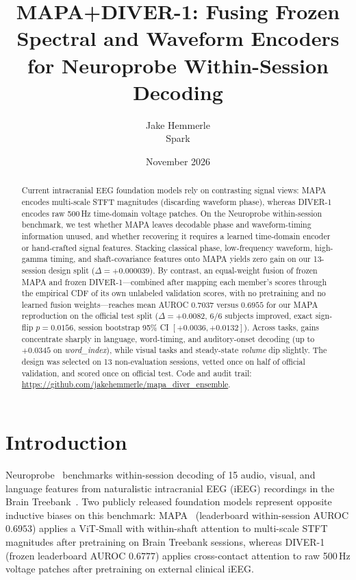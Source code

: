 \documentclass[11pt]{article}
\title{MAPA+DIVER-1: Fusing Frozen Spectral and Waveform Encoders\\for Neuroprobe Within-Session Decoding}
\author{Jake Hemmerle\\Spark}
\date{November 2026}
\newcommand{\coderepo}{\url{https://github.com/jakehemmerle/mapa_diver_ensemble}}
\begin{document}
\maketitle

\begin{abstract}
Current intracranial EEG foundation models rely on contrasting signal views: MAPA encodes multi-scale STFT magnitudes (discarding waveform phase), whereas DIVER-1 encodes raw 500\,Hz time-domain voltage patches. On the Neuroprobe within-session benchmark, we test whether MAPA leaves decodable phase and waveform-timing information unused, and whether recovering it requires a learned time-domain encoder or hand-crafted signal features. Stacking classical phase, low-frequency waveform, high-gamma timing, and shaft-covariance features onto MAPA yields zero gain on our 13-session design split ($\Delta=+0.000039$). By contrast, an equal-weight fusion of frozen MAPA and frozen DIVER-1---combined after mapping each member's scores through the empirical CDF of its own unlabeled validation scores, with no pretraining and no learned fusion weights---reaches mean AUROC $0.7037$ versus $0.6955$ for our MAPA reproduction on the official test split ($\Delta=+0.0082$, $6/6$ subjects improved, exact sign-flip $p=0.0156$, session bootstrap 95\% CI $[+0.0036,+0.0132]$). Across tasks, gains concentrate sharply in language, word-timing, and auditory-onset decoding (up to $+0.0345$ on \emph{word\_index}), while visual tasks and steady-state \emph{volume} dip slightly. The design was selected on 13 non-evaluation sessions, vetted once on half of official validation, and scored once on official test. Code and audit trail: \coderepo.
\end{abstract}

\section{Introduction}
Neuroprobe~\cite{neuroprobe,neuroprobe-site,neuroprobe-repo} benchmarks within-session decoding of 15 audio, visual, and language features from naturalistic intracranial EEG (iEEG) recordings in the Brain Treebank~\cite{btbank}. Two publicly released foundation models represent opposite inductive biases on this benchmark: MAPA~\cite{mapa} (leaderboard within-session AUROC $0.6953$) applies a ViT-Small with within-shaft attention to multi-scale STFT magnitudes after pretraining on Brain Treebank sessions, whereas DIVER-1~\cite{diver} (frozen leaderboard AUROC $0.6777$) applies cross-contact attention to raw 500\,Hz voltage patches after pretraining on external clinical iEEG.
\end{document}
